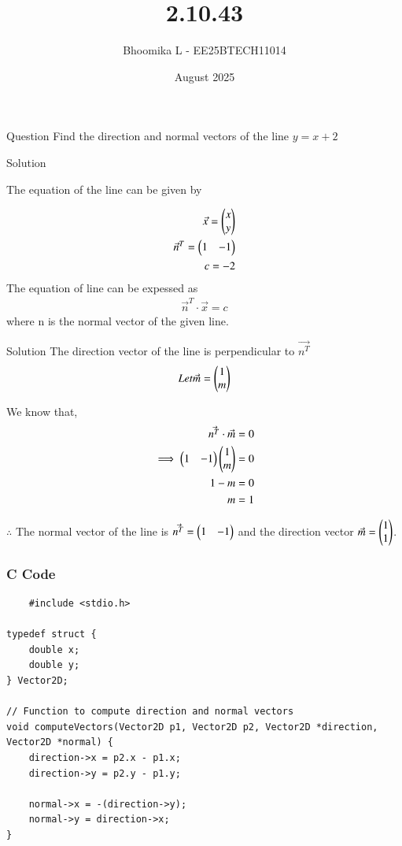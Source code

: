 \documentclass{beamer}
\title %
{2.10.43}
\date{August  2025}
\author %
{Bhoomika L - EE25BTECH11014}
\begin{document}
\frame{\titlepage}
\begin{frame}{Question}
Find the direction and normal vectors of the line $y = x + 2$
\end{frame}

\begin{frame}{Solution}
\begin{center}
      The equation of the line can be given by
\end{center}
  \begin{align}
      \Vec{x}=\begin{pmatrix}x\\y\end{pmatrix}\\
      \Vec{n}^T=\begin{pmatrix}1&-1\end{pmatrix}\\
      c=-2
      \end{align}
The equation of line can be expessed as
\begin{align}
     \Vec{n}^T \cdot\Vec{x}=c
\end{align}
where n is the normal vector of the given line.
\end{frame}

\begin{frame}{Solution}
The direction vector of the line is perpendicular to $\Vec{n^T}$
\begin{align}
  Let \Vec{m}=\begin{pmatrix}1\\m\end{pmatrix}
\end{align}

We know that,
\begin{align}
    \Vec{n^T}\cdot \Vec{m}=0\\
    \implies \begin{pmatrix}1&-1\end{pmatrix}\begin{pmatrix}1\\m\end{pmatrix}=0\\
    1-m=0\\
    m=1
\end{align}
\begin{center}
    $\therefore$ The normal vector of the line is $\Vec{n^T}= \begin{pmatrix}1&-1\end{pmatrix}$ and the direction vector $\Vec{m}=\begin{pmatrix}1\\1\end{pmatrix}$.
\end{center}
\end{frame}

\begin{frame}[fragile]
\frametitle{C Code }
\begin{lstlisting}
    #include <stdio.h>

typedef struct {
    double x;
    double y;
} Vector2D;

// Function to compute direction and normal vectors
void computeVectors(Vector2D p1, Vector2D p2, Vector2D *direction, Vector2D *normal) {
    direction->x = p2.x - p1.x;
    direction->y = p2.y - p1.y;

    normal->x = -(direction->y);
    normal->y = direction->x;
}

\end{lstlisting}
\end{frame}
\end{document}
